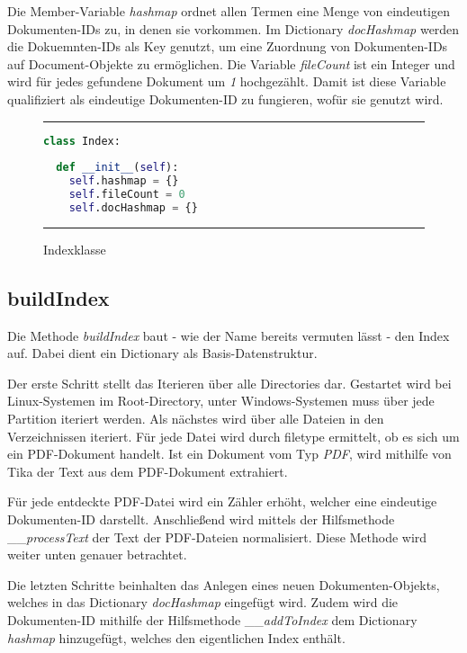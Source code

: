 Die Member-Variable \emph{hashmap} ordnet allen Termen eine Menge von eindeutigen Dokumenten-IDs zu, in denen sie vorkommen. Im Dictionary \emph{docHashmap} werden die Dokuemnten-IDs als Key genutzt, um eine Zuordnung von Dokumenten-IDs auf Document-Objekte zu ermöglichen. Die Variable \emph{fileCount} ist ein Integer und wird für jedes gefundene Dokument um \emph{1} hochgezählt. Damit ist diese Variable qualifiziert als eindeutige Dokumenten-ID zu fungieren, wofür sie genutzt wird.

\begin{figure}[h]
	\rule{\textwidth}{0.4pt}
		\begin{lstlisting}[language=Python]
class Index:
  
  def __init__(self):
    self.hashmap = {}
    self.fileCount = 0
    self.docHashmap = {}
		\end{lstlisting}
	\rule{\textwidth}{0.4pt}
	\caption{Indexklasse}
	\label{fig:index}
\end{figure}

\subsection{buildIndex}\label{buildindex}

Die Methode \emph{buildIndex} baut - wie der Name bereits vermuten lässt - den Index auf. Dabei dient ein Dictionary als Basis-Datenstruktur.

Der erste Schritt stellt das Iterieren über alle Directories dar. Gestartet wird bei Linux-Systemen im Root-Directory, unter Windows-Systemen muss über jede Partition iteriert werden. Als nächstes wird über alle Dateien in den Verzeichnissen iteriert. Für jede Datei wird durch filetype ermittelt, ob es sich um ein PDF-Dokument handelt. Ist ein Dokument vom Typ \emph{PDF}, wird mithilfe von Tika der Text aus dem PDF-Dokument extrahiert.

Für jede entdeckte PDF-Datei wird ein Zähler erhöht, welcher eine eindeutige Dokumenten-ID darstellt. Anschließend wird mittels der Hilfsmethode \_\_\emph{processText} der Text der PDF-Dateien normalisiert. Diese Methode wird weiter unten genauer betrachtet. 

Die letzten Schritte beinhalten das Anlegen eines neuen Dokumenten-Objekts, welches in das Dictionary \emph{docHashmap} eingefügt wird. Zudem wird die Dokumenten-ID mithilfe der Hilfsmethode \_\_\emph{addToIndex} dem Dictionary \emph{hashmap} hinzugefügt, welches den eigentlichen Index enthält.

